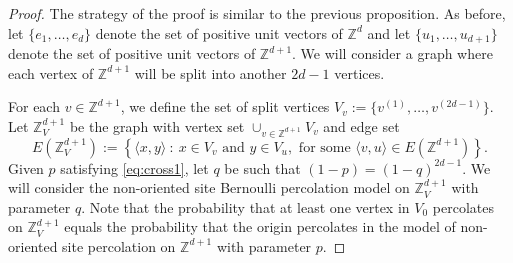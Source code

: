 \documentclass{aptpub}
\newcommand{\Z}{\mathbb{Z}}
\begin{document}

\begin{proof}
The strategy of the proof is similar to the previous proposition. As before, let $\{e_1, \dots, e_d\}$ denote the set of positive unit vectors of $\Z^d$ and let $\{ u_1, \dots, u_{d+1}\}$ denote the set of positive unit vectors of $\Z^{d+1}$. We will consider a graph where each vertex of $\Z^{d+1}$ will be split into another $2d-1$ vertices. %

For each $v \in \Z^{d+1}$, we define the set of split vertices $V_v := \{v^{(1)}, \dots, v^{(2d-1)}\}$. Let $\Z^{d+1}_V$ be the graph with vertex set  $\cup_{v \in \Z^{d+1}} V_v$ and  edge set
\begin{equation*}
    E(\Z^{d+1}_V) := \left\{ \langle x,y \rangle ~:~ x \in V_v \text{ and } y \in V_u, \text{ for some } \langle v,u \rangle \in E(\Z^{d+1}) \right\}.
\end{equation*}
Given $p$ satisfying \eqref{eq:cross1}, let $q$ be such that $(1-p) = (1-q)^{2d-1}$. We will consider the non-oriented site Bernoulli percolation model on $\Z^{d+1}_V$ with parameter $q$. Note that the probability that at least one vertex in $V_0$ percolates on $\mathbb{Z}^{d+1}_V$  equals  the probability that the origin percolates in the model of non-oriented site percolation on $\mathbb{Z}^{d+1}$ with parameter $p$.




\end{proof}
\end{document}

